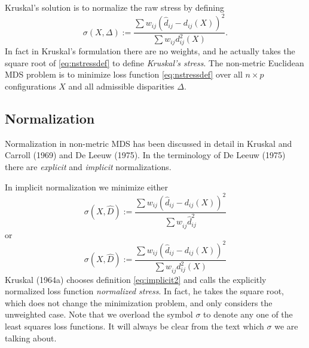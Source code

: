 \documentclass[
  12pt,
]{article}
\begin{document}
Kruskal's solution is to normalize the raw stress by defining
\begin{equation}
\sigma(X,\Delta):=\frac{\sum w_{ij}(\hat d_{ij}-d_{ij}(X))^2}{\sum w_{ij}d_{ij}^2(X)}.
\label{eq:nstressdef}
\end{equation} In fact in Kruskal's formulation there are no weights,
and he actually takes the square root of \eqref{eq:nstressdef} to define
\emph{Kruskal's stress}. The non-metric Euclidean MDS problem is to minimize
loss function \eqref{eq:nstressdef} over all \(n\times p\) configurations
\(X\) and all admissible disparities \(\Delta\).

\subsection{Normalization}\label{normalization}

Normalization in non-metric MDS has been discussed in detail in
Kruskal and Carroll (1969) and De Leeuw (1975). In the terminology of
De Leeuw (1975) there are \emph{explicit} and \emph{implicit} normalizations.

In implicit normalization we minimize either \begin{equation}
\sigma(X,\hat D):=\frac{\sum  w_{ij}(\hat d_{ij} -d_{ij}(X))^2}{\sum   w_{ij}^{\ }\hat d_{ij}^2}
\label{eq:implicit1}
\end{equation} or \begin{equation}
\sigma(X,\hat D):=\frac{\sum   w_{ij}(\hat d_{ij}-d_{ij}(X))^2}{\sum   w_{ij}^{\ }d_{ij}^2(X) }
\label{eq:implicit2}
\end{equation} Kruskal (1964a) chooses definition \eqref{eq:implicit2} and
calls the explicitly normalized loss function \emph{normalized stress}. In
fact, he takes the square root, which does not change the minimization
problem, and only considers the unweighted case. Note that we overload
the symbol \(\sigma\) to denote any one of the least squares loss
functions. It will always be clear from the text which \(\sigma\) we are
talking about.
\end{document}

